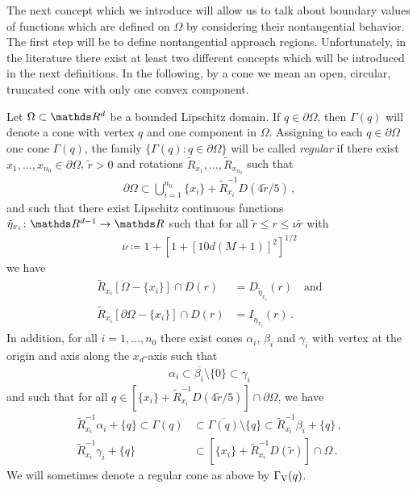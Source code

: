 The next concept which we introduce will allow us to talk about boundary values of functions which are defined on $\Omega$ by considering their nontangential behavior.
The first step will be to define nontangential approach regions.
Unfortunately, in the literature there exist at least two different concepts which will be introduced in the next definitions.
  In the following, by a cone we mean an open, circular, truncated cone with only one convex component.

\begin{defn}
  \label{defn:regularFamilyOfCones}
  Let $\Omega \subset \R^d$ be a bounded Lipschitz domain.
  If $q \in \partial\Omega$, then $\Gamma(q)$ will denote a cone with vertex $q$ and one component in $\Omega$.
  Assigning to each $q \in \partial\Omega$ one cone $\Gamma(q)$, the family $\big\{ \Gamma(q) \colon q \in \partial\Omega \big\}$ will be called \emph{regular} if there exist $x_1, \dots,x_{n_0} \in \partial\Omega$, $\tilde r > 0$ and rotations $\tilde R_{x_1}, \dots, \tilde R_{x_{n_0}}$ such that
  \begin{align*}
    \partial\Omega \subset \bigcup_{i = 1}^{n_0} \{ x_i \} + \tilde R_{x_i}^{-1} D(4 \tilde r / 5)\,,
  \end{align*}
  and such that there exist Lipschitz continuous functions $\tilde \eta_{x_i} \colon \R^{d - 1} \to \R$ such that for all $\tilde r \leq r \leq \nu \tilde r$ with 
  \begin{align*}
    \nu \coloneqq 1 + [ 1 + [10 d(M + 1)]^2]^{1/2}
  \end{align*}
  we have
  \begin{align*}
    \tilde R_{x_i}[\Omega - \{x_i\}] \cap D(r) &= D_{\tilde \eta_{x_i}}(r) \quad\text{and}\\[0.5em]
    \tilde R_{x_i}[\partial\Omega - \{x_i\}] \cap D(r) &= I_{\tilde \eta_{x_i}}(r)\,.
  \end{align*}
  In addition, for all $i = 1,\dots,n_0$ there exist cones $\alpha_i$, $\beta_i$ and $\gamma_i$ with vertex at the origin and axis along the $x_d$-axis such that
  \begin{align*}
    \alpha_i \subset \overline{\beta_i} \setminus\{0\} \subset \gamma_i
  \end{align*}
  and such that for all $q \in [ \{ x_i\} + \tilde R_{x_i}^{-1} D(4 \tilde r / 5)] \cap \partial\Omega$, we have
  \begin{align*}
    \tilde R_{x_i}^{-1} \alpha_i + \{ q\} \subset \Gamma(q) &\subset \overline{\Gamma(q)} \setminus \{q\} \subset \tilde R_{x_i}^{-1} \beta_i + \{ q\}\,, \\[0.5em]
    \tilde R_{x_i}^{-1} \gamma_i + \{q\} &\subset [\{ x_i\} + \tilde R_{x_i}^{-1} D(\tilde r)] \cap \Omega\,.
  \end{align*}
  We will sometimes denote a regular cone as above by $\Gamma_\mathrm{V}(q)$.
\end{defn}

